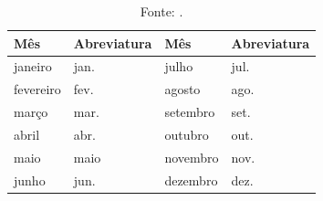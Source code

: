\documentclass[tcc,capa]{texufpel}
\begin{document}
\begin{table}[htbp]
  \caption{Abreviatura dos meses em português}
  \centering
  \begin{tabular}{llll}
    \hline
    Mês & Abreviatura & Mês & Abreviatura \\
    \hline
    janeiro   & jan.  & julho    & jul. \\
    fevereiro & fev.  & agosto   & ago. \\
    março     & mar.  & setembro & set. \\
    abril     & abr.  & outubro  & out. \\
    maio      & maio  & novembro & nov. \\
    junho     & jun.  & dezembro & dez. \\
    \hline
  \end{tabular}
  \caption*{Fonte: \citet{ABNT:2018:NBR6023}.}
\end{table}
\end{document}
